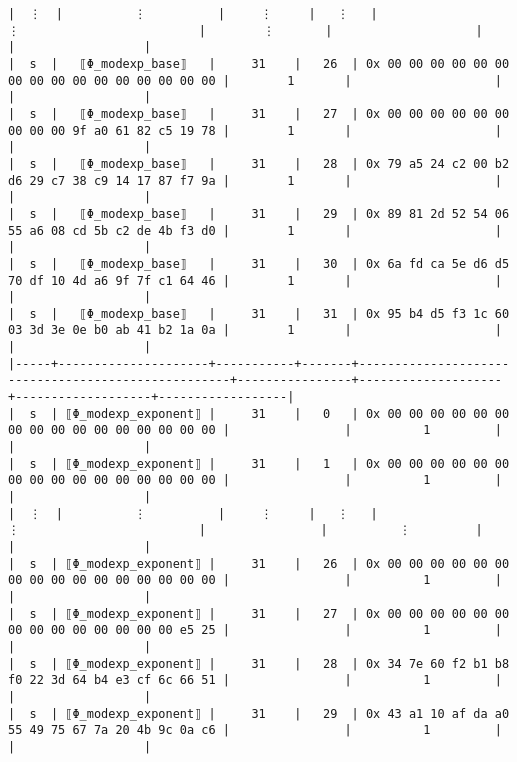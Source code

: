 \documentclass[varwidth=\maxdimen,margin=0.5cm,multi={verbatim}]{standalone}
\begin{document}
\begin{verbatim}
|  ⋮  |          ⋮          |     ⋮     |   ⋮   |                          ⋮                         |        ⋮       |                    |                   |                  |
|  s  |   ⟦Φ_modexp_base⟧   |     31    |   26  | 0x 00 00 00 00 00 00 00 00 00 00 00 00 00 00 00 00 |        1       |                    |                   |                  |
|  s  |   ⟦Φ_modexp_base⟧   |     31    |   27  | 0x 00 00 00 00 00 00 00 00 00 9f a0 61 82 c5 19 78 |        1       |                    |                   |                  |
|  s  |   ⟦Φ_modexp_base⟧   |     31    |   28  | 0x 79 a5 24 c2 00 b2 d6 29 c7 38 c9 14 17 87 f7 9a |        1       |                    |                   |                  |
|  s  |   ⟦Φ_modexp_base⟧   |     31    |   29  | 0x 89 81 2d 52 54 06 55 a6 08 cd 5b c2 de 4b f3 d0 |        1       |                    |                   |                  |
|  s  |   ⟦Φ_modexp_base⟧   |     31    |   30  | 0x 6a fd ca 5e d6 d5 70 df 10 4d a6 9f 7f c1 64 46 |        1       |                    |                   |                  |
|  s  |   ⟦Φ_modexp_base⟧   |     31    |   31  | 0x 95 b4 d5 f3 1c 60 03 3d 3e 0e b0 ab 41 b2 1a 0a |        1       |                    |                   |                  |
|-----+---------------------+-----------+-------+----------------------------------------------------+----------------+--------------------+-------------------+------------------|
|  s  | ⟦Φ_modexp_exponent⟧ |     31    |   0   | 0x 00 00 00 00 00 00 00 00 00 00 00 00 00 00 00 00 |                |          1         |                   |                  |
|  s  | ⟦Φ_modexp_exponent⟧ |     31    |   1   | 0x 00 00 00 00 00 00 00 00 00 00 00 00 00 00 00 00 |                |          1         |                   |                  |
|  ⋮  |          ⋮          |     ⋮     |   ⋮   |                          ⋮                         |                |          ⋮         |                   |                  |
|  s  | ⟦Φ_modexp_exponent⟧ |     31    |   26  | 0x 00 00 00 00 00 00 00 00 00 00 00 00 00 00 00 00 |                |          1         |                   |                  |
|  s  | ⟦Φ_modexp_exponent⟧ |     31    |   27  | 0x 00 00 00 00 00 00 00 00 00 00 00 00 00 00 e5 25 |                |          1         |                   |                  |
|  s  | ⟦Φ_modexp_exponent⟧ |     31    |   28  | 0x 34 7e 60 f2 b1 b8 f0 22 3d 64 b4 e3 cf 6c 66 51 |                |          1         |                   |                  |
|  s  | ⟦Φ_modexp_exponent⟧ |     31    |   29  | 0x 43 a1 10 af da a0 55 49 75 67 7a 20 4b 9c 0a c6 |                |          1         |                   |                  |

\end{verbatim}
\end{document}
